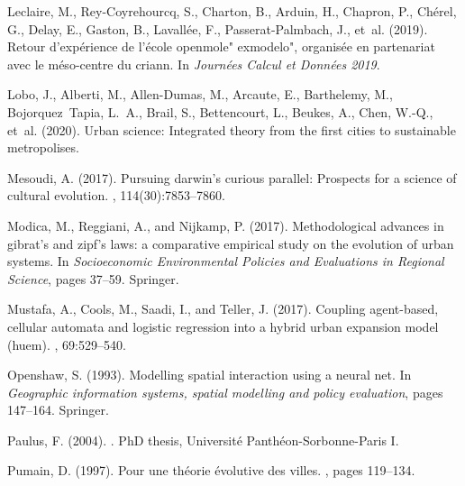 \documentclass[10pt]{article}
\begin{document}
\begin{thebibliography}{}
Leclaire, M., Rey-Coyrehourcq, S., Charton, B., Arduin, H., Chapron, P.,
  Ch{\'e}rel, G., Delay, E., Gaston, B., Lavall{\'e}e, F., Passerat-Palmbach,
  J., et~al. (2019).
\newblock Retour d'exp{\'e}rience de l'{\'e}cole openmole" exmodelo",
  organis{\'e}e en partenariat avec le m{\'e}so-centre du criann.
\newblock In {\em Journ{\'e}es Calcul et Donn{\'e}es 2019}.

Lobo, J., Alberti, M., Allen-Dumas, M., Arcaute, E., Barthelemy, M.,
  Bojorquez~Tapia, L.~A., Brail, S., Bettencourt, L., Beukes, A., Chen, W.-Q.,
  et~al. (2020).
\newblock Urban science: Integrated theory from the first cities to sustainable
  metropolises.

Mesoudi, A. (2017).
\newblock Pursuing darwin’s curious parallel: Prospects for a science of
  cultural evolution.
,
  114(30):7853--7860.

Modica, M., Reggiani, A., and Nijkamp, P. (2017).
\newblock Methodological advances in gibrat’s and zipf’s laws: a
  comparative empirical study on the evolution of urban systems.
\newblock In {\em Socioeconomic Environmental Policies and Evaluations in
  Regional Science}, pages 37--59. Springer.

Mustafa, A., Cools, M., Saadi, I., and Teller, J. (2017).
\newblock Coupling agent-based, cellular automata and logistic regression into
  a hybrid urban expansion model (huem).
, 69:529--540.

Openshaw, S. (1993).
\newblock Modelling spatial interaction using a neural net.
\newblock In {\em Geographic information systems, spatial modelling and policy
  evaluation}, pages 147--164. Springer.

Paulus, F. (2004).
.
\newblock PhD thesis, Universit{\'e} Panth{\'e}on-Sorbonne-Paris I.

Pumain, D. (1997).
\newblock Pour une th{\'e}orie {\'e}volutive des villes.
, pages 119--134.


\end{thebibliography}
\end{document}
